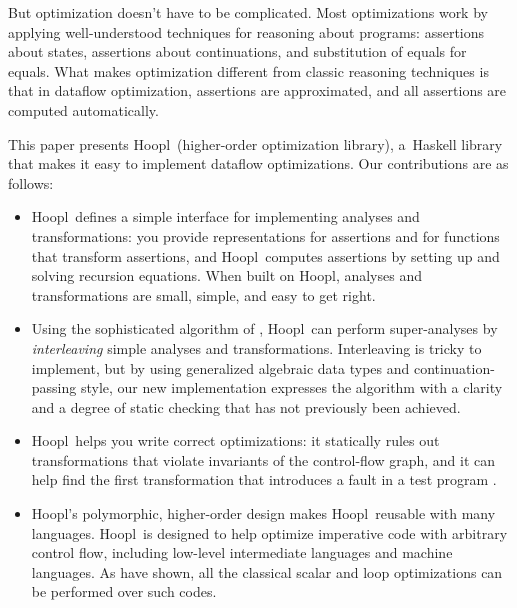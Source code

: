 \documentclass[blockstyle,preprint,natbib,nocopyrightspace]{sigplanconf}
\newcommand\ourlib{Hoopl}  %
\let\hoopl\ourlib
\let\cite\citep
\newcommand\secref[1]{Section~\ref{sec:#1}}
\begin{document}
But optimization doesn't have to be complicated.
Most optimizations
work by applying well-understood techniques for
reasoning about programs:
assertions about states, assertions about continuations, and
substitution of equals for equals.  %
What makes optimization different from classic reasoning techniques
is that in dataflow optimization, assertions are approximated,
and all assertions are computed automatically.

This paper presents \ourlib\ (higher-order optimization library), 
a~Haskell library that makes it easy to implement dataflow optimizations.
Our contributions are as follows:
\begin{itemize}
\item
\ourlib\ defines a simple interface for implementing analyses and transformations:
you provide representations for assertions and for functions that
transform assertions, 
and \ourlib\ computes assertions
 by setting up and solving recursion
equations.
When built on \ourlib, analyses and transformations
are small, simple, and easy to get right.
\item
Using the sophisticated algorithm of \citet{lerner-grove-chambers:2002},
\ourlib\ can perform super-analyses by \emph{interleaving}
simple analyses and transformations.
Interleaving is tricky to implement,
but by using 
generalized algebraic data types 
and continuation-passing style,
our new implementation expresses the algorithm with a clarity and a
degree of 
static checking that has not 
previously been achieved.
\item
\ourlib\ helps you write correct optimizations:
it
statically rules out transformations that violate invariants
of the control-flow graph,
and it can help find the first transformation that introduces a fault
in a test program \cite{whalley:isolation}.
\item
\ourlib's polymorphic, higher-order design makes \ourlib\ reusable
with many languages.
\hoopl\ is designed to help optimize imperative code
with arbitrary control flow,
including low-level intermediate languages and machine languages.
As \citet{benitez-davidson:portable-optimizer} have shown, all the
classical scalar and loop optimizations can be performed over such
codes.
\end{itemize}
\end{document}
